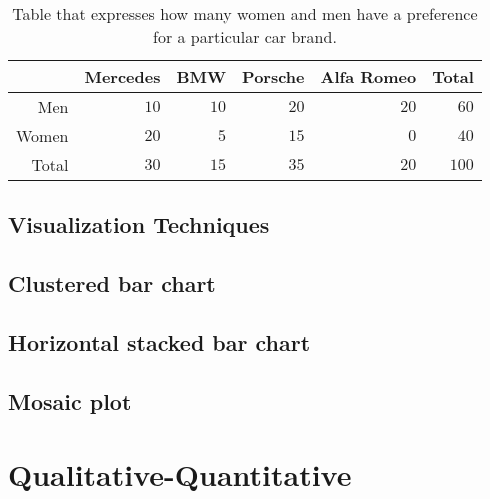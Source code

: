 \begin{table} \centering
  \begin{tabular}{@{}rrrrrr@{}}
  	\toprule
  	        & Mercedes &  BMW & Porsche & Alfa Romeo & Total  \\
  	\midrule
  	    Men &     $10$ & $10$ &    $20$ &       $20$ &   $60$ \\
  	  Women &     $20$ &  $5$ &    $15$ &        $0$ &   $40$ \\
  	  Total &     $30$ & $15$ &    $35$ &       $20$ &  $100$ \\
  	\bottomrule
  \end{tabular}
  \caption{Table that expresses how many women and men have a preference for a particular car brand.}
  \label{tab:car-preference}
\end{table}

\subsection{Visualization Techniques}
\label{ssec:kwal-kwal-visualization}

\subsection{Clustered bar chart}
\subsection{Horizontal stacked bar chart}
\subsection{Mosaic plot}

\section{Qualitative-Quantitative}
\label{sec:qualitative-quantitative}
































